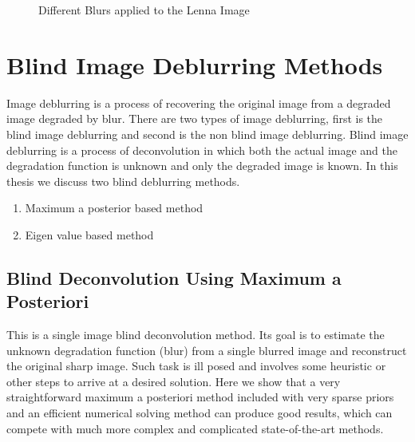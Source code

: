 \documentclass{article}
\begin{document}
\begin{figure}[ht]
    \centering
    \qquad
    \qquad
    \qquad
    \caption{\centering Different Blurs applied to the Lenna Image \label{fig:lenna-blur}}
\end{figure}

\clearpage
\section{Blind Image Deblurring Methods}
Image deblurring is a process of recovering the original image from a degraded image degraded by blur. There are two types of image deblurring, first is the blind image deblurring and second is the non blind image deblurring. Blind image deblurring is a process of deconvolution in which both the actual image and the degradation function is unknown and only the degraded image is known. In this thesis we discuss two blind deblurring methods. 

\begin{enumerate}
    \item Maximum a posterior based method 
    \item Eigen value based method 
\end{enumerate}

\subsection{Blind Deconvolution Using Maximum a Posteriori} \cite{24}
This is a single image blind deconvolution method. Its goal is to estimate the unknown degradation function (blur) from a single blurred image and reconstruct the original sharp image. Such task is ill posed and involves some heuristic or other steps to arrive at a desired solution. Here we show that a very straightforward maximum a posteriori method included with very sparse priors and an efficient numerical solving method can produce good results, which can compete with much more  complex and complicated state-of-the-art methods. \\
\end{document}
